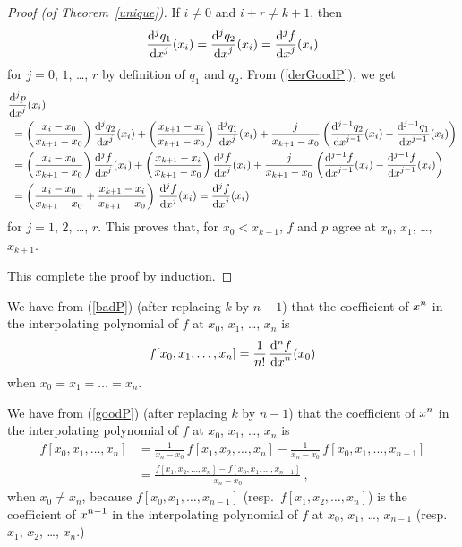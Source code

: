 \begin{proof}[Proof (of Theorem~\ref{unique})]
If $i\neq 0$ and $i+r \neq k+1$, then
\[
\displaystyle \frac{\mathrm{d}^{j}{q_1}} {\displaystyle \mathrm{d}{x}^{j}}(x_i) = \displaystyle \frac{\mathrm{d}^{j}{q_2}} {\displaystyle \mathrm{d}{x}^{j}}(x_i) = \displaystyle \frac{\mathrm{d}^{j}{f}} {\displaystyle \mathrm{d}{x}^{j}}(x_i)
\]
for $j=0$, $1$, \ldots, $r$ by definition of $q_1$ and $q_2$.
From (\ref{derGoodP}), we get
\begin{align*}
&\displaystyle \frac{\mathrm{d}^{j}{p}} {\displaystyle \mathrm{d}{x}^{j}}(x_i) \\
&\ = \left( \frac{x_i-x_0}{x_{k+1}-x_0}\right)\displaystyle \frac{\mathrm{d}^{j}{q_2}} {\displaystyle \mathrm{d}{x}^{j}}(x_i) +
\left(\frac{x_{k+1}-x_i}{x_{k+1}-x_0}\right) \displaystyle \frac{\mathrm{d}^{j}{q_1}} {\displaystyle \mathrm{d}{x}^{j}}(x_i)
+ \frac{j}{x_{k+1}-x_0}\left(
\displaystyle \frac{\mathrm{d}^{j-1}{q_2}} {\displaystyle \mathrm{d}{x}^{j-1}}(x_i)-\displaystyle \frac{\mathrm{d}^{j-1}{q_1}} {\displaystyle \mathrm{d}{x}^{j-1}}(x_i)\right) \\
&\ = \left(\frac{x_i-x_0}{x_{k+1}-x_0}\right)\displaystyle \frac{\mathrm{d}^{j}{f}} {\displaystyle \mathrm{d}{x}^{j}}(x_i) +
\left(\frac{x_{k+1}-x_i}{x_{k+1}-x_0}\right) \displaystyle \frac{\mathrm{d}^{j}{f}} {\displaystyle \mathrm{d}{x}^{j}}(x_i)
+\frac{j}{x_{k+1}-x_0}\left(
\displaystyle \frac{\mathrm{d}^{j-1}{f}} {\displaystyle \mathrm{d}{x}^{j-1}}(x_i)-\displaystyle \frac{\mathrm{d}^{j-1}{f}} {\displaystyle \mathrm{d}{x}^{j-1}}(x_i)\right) \\
&\ = \left( \frac{x_i-x_0}{x_{k+1}-x_0} +
  \frac{x_{k+1}-x_i}{x_{k+1}-x_0} \right) \,\displaystyle \frac{\mathrm{d}^{j}{f}} {\displaystyle \mathrm{d}{x}^{j}}(x_i)
= \displaystyle \frac{\mathrm{d}^{j}{f}} {\displaystyle \mathrm{d}{x}^{j}}(x_i)
\end{align*}
for $j=1$, $2$, \ldots, $r$.
This proves that, for $x_0 < x_{k+1}$, $f$ and $p$ agree at
$x_0$, $x_1$, \ldots, $x_{k+1}$.

This complete the proof by induction.
\end{proof}

\begin{rmk}
We have from (\ref{badP}) (after replacing $k$ by $n-1$) that the
coefficient of $\displaystyle x^n$ in the interpolating polynomial of
$f$ at $x_0$, $x_1$, \ldots, $x_n$ is
\begin{equation}\label{coeffA}
f[x_0,x_1,\ldots,x_n] = \frac{1}{n!}\,\displaystyle \frac{\mathrm{d}^{n}{f}} {\displaystyle \mathrm{d}{x}^{n}}(x_0)
\end{equation}
when $x_0 = x_1 = \ldots = x_n$.

We have from (\ref{goodP}) (after replacing $k$ by $n-1$) that the
coefficient of $\displaystyle x^n$ in the interpolating polynomial of
$f$ at $x_0$, $x_1$, \ldots, $x_n$ is
\begin{align*}
f[x_0,x_1,\ldots,x_n] &= \frac{1}{x_n-x_0}\,f[x_1,x_2,\ldots,x_n] -
\frac{1}{x_n-x_0}\, f[x_0,x_1,\ldots,x_{n-1}] \\
&= \frac{f[x_1,x_2,\ldots,x_n]-f[x_0,x_1,\ldots,x_{n-1}]}{x_n-x_0} \ ,
\end{align*}
when $x_0 \neq x_n$, because $f[x_0,x_1,\ldots,x_{n-1}]$ (resp.\
$f[x_1,x_2,\ldots,x_n]$) is the coefficient of $\displaystyle x^{n-1}$ in the
interpolating polynomial of $f$ at
$x_0$, $x_1$, \ldots, $x_{n-1}$ (resp.\ $x_1$, $x_2$, \ldots, $x_n$.)
\label{rmkNDDF}
\end{rmk}

